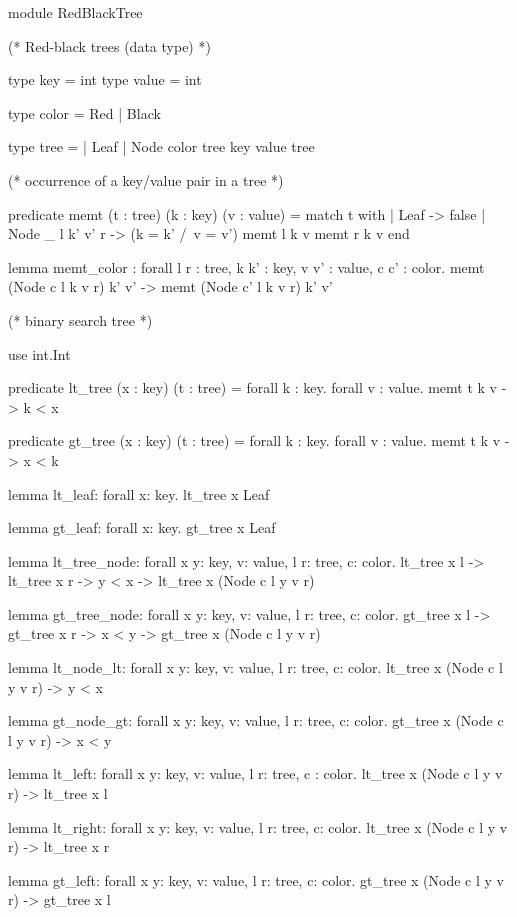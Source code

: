 \begin{whylang}
module RedBlackTree

  (* Red-black trees (data type) *)

  type key = int
  type value = int

  type color = Red | Black

  type tree =
    | Leaf
    | Node color tree key value tree

  (* occurrence of a key/value pair in a tree *)

  predicate memt (t : tree) (k : key) (v : value) =
    match t with
    | Leaf -> false
    | Node _ l k' v' r -> (k = k' /\ v = v') \/ memt l k v \/ memt r k v
    end

  lemma memt_color :
    forall l r : tree, k k' : key, v v' : value, c c' : color.
    memt (Node c l k v r) k' v' -> memt (Node c' l k v r) k' v'

  (* binary search tree *)

  use int.Int

  predicate lt_tree (x : key) (t : tree) =
    forall k : key. forall v : value. memt t k v -> k < x

  predicate gt_tree (x : key) (t : tree) =
    forall k : key. forall v : value. memt t k v -> x < k

  lemma lt_leaf: forall x: key. lt_tree x Leaf

  lemma gt_leaf: forall x: key. gt_tree x Leaf

  lemma lt_tree_node:
    forall x y: key, v: value, l r: tree, c: color.
    lt_tree x l -> lt_tree x r -> y < x -> lt_tree x (Node c l y v r)

  lemma gt_tree_node:
    forall x y: key, v: value, l r: tree, c: color.
    gt_tree x l -> gt_tree x r -> x < y -> gt_tree x (Node c l y v r)

  lemma lt_node_lt:
    forall x y: key, v: value, l r: tree, c: color.
    lt_tree x (Node c l y v r) -> y < x

  lemma gt_node_gt:
    forall x y: key, v: value, l r: tree, c: color.
    gt_tree x (Node c l y v r) -> x < y

  lemma lt_left:
    forall x y: key, v: value, l r: tree, c : color.
    lt_tree x (Node c l y v r) -> lt_tree x l

  lemma lt_right:
    forall x y: key, v: value,  l r: tree, c: color.
    lt_tree x (Node c l y v r) -> lt_tree x r

  lemma gt_left:
    forall x y: key, v: value, l r: tree, c: color.
    gt_tree x (Node c l y v r) -> gt_tree x l


\end{whylang}
